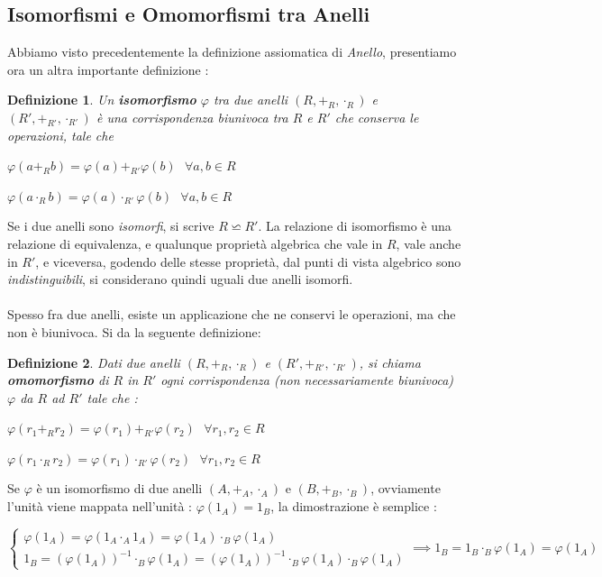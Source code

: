 \documentclass[12pt, letterpaper]{article}
\begin{document}
\subsection{Isomorfismi e Omomorfismi tra Anelli}
Abbiamo visto precedentemente la definizione assiomatica di \textit{Anello}, presentiamo ora un altra importante 
definizione : \newtheorem{deff}{Definizione}
\begin{deff}
    Un \textbf{isomorfismo}  \(\varphi\) tra due anelli \((R,+_R,\cdot_R)\) e \((R',+_{R'},\cdot_{R'})\) è una corrispondenza biunivoca tra \(R\) e \(R'\) che 
    conserva le operazioni, tale che \begin{center}
        \(\varphi(a+_Rb)=\varphi(a)+_{R'} \varphi(b)\text{ } \forall a,b\in R  \)
    \end{center}
    \begin{center}
        \(\varphi(a\cdot_R b)=\varphi(a)\cdot_{R'} \varphi(b)\text{ } \forall a,b\in R  \)
    \end{center}
\end{deff}
Se i due anelli sono \textit{isomorfi}, si scrive \(R\backsimeq  R'\). La relazione di isomorfismo è una relazione 
di equivalenza, e qualunque proprietà algebrica che vale in \(R\), vale anche in \(R'\), e viceversa, godendo delle 
stesse proprietà, dal punti di vista algebrico sono \textit{indistinguibili}, si considerano quindi uguali due 
anelli isomorfi. \\\hphantom{.}\\
Spesso fra due anelli, esiste un applicazione che ne conservi le operazioni, ma che non è biunivoca. Si da la seguente 
definizione:\begin{deff}
    Dati due anelli \((R,+_R,\cdot_R)\) e \((R',+_{R'},\cdot_{R'})\), si chiama \textbf{omomorfismo} di \(R\) in \(R'\) ogni 
    corrispondenza (non necessariamente biunivoca) \(\varphi\) da \(R\) ad \(R'\) tale che :
    \begin{center}
        \(\varphi(r_1+_Rr_2)=\varphi(r_1)+_{R'} \varphi(r_2)\text{ } \forall r_1,r_2\in R  \)
    \end{center}
    \begin{center}
        \(\varphi(r_1\cdot_R r_2)=\varphi(r_1)\cdot_{R'} \varphi(r_2) \text{ }\forall r_1,r_2\in R  \)
    \end{center}
\end{deff}
Se \(\varphi\) è un isomorfismo di due anelli \((A,+_A,\cdot_A)\) e \((B,+_B,\cdot_B)\), ovviamente 
l'unità viene mappata nell'unità : \(\varphi(1_A)=1_B\), la dimostrazione è semplice : \begin{center}
    \(
      \begin{cases}
        \varphi(1_A)=\varphi(1_A\cdot_A 1_A)=\varphi(1_A)\cdot_B \varphi(1_A)\\
        1_B=(\varphi(1_A))^{-1}\cdot_B\varphi(1_A) = (\varphi(1_A))^{-1}\cdot_B\varphi(1_A)\cdot_B\varphi(1_A)
      \end{cases}  
      \implies  1_B = 1_B \cdot_B \varphi(1_A) = \varphi(1_A) 
    \)
\end{center}   
\end{document}
